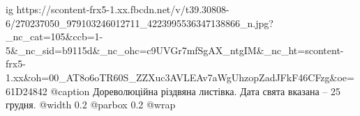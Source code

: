  
 
 
 
 

\ifcmt
  ig https://scontent-frx5-1.xx.fbcdn.net/v/t39.30808-6/270237050_979103246012711_4223995536347138866_n.jpg?_nc_cat=105&ccb=1-5&_nc_sid=b9115d&_nc_ohc=c9UVGr7mfSgAX_ntgIM&_nc_ht=scontent-frx5-1.xx&oh=00_AT8o6oTR60S_ZZXuc3AVLEAv7aWgUhzopZadJFkF46CFzg&oe=61D24842
  @caption Дореволюційна різдвяна листівка. Дата свята вказана – 25 грудня.
  @width 0.2
	@parbox 0.2
  @wrap \parpic[r]
\fi

